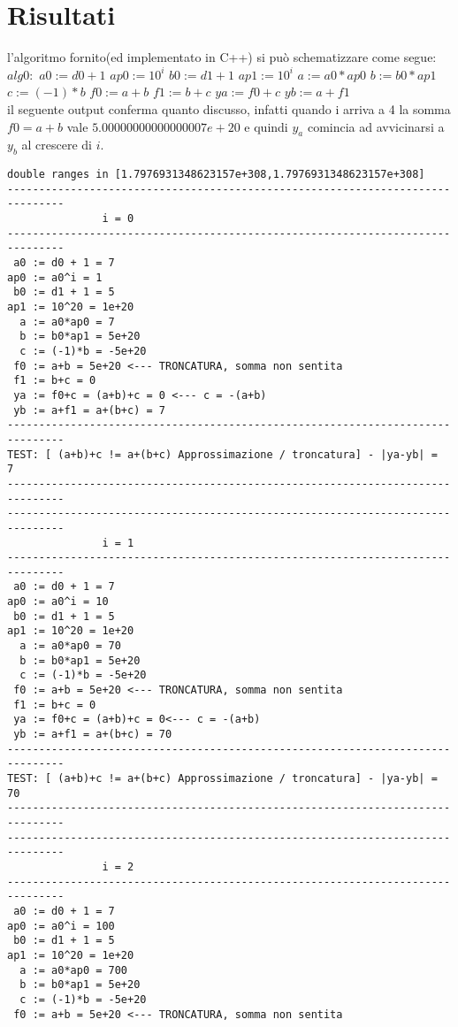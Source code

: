 \documentclass[10pt,a4paper]{article}
\begin{document}
\section{Risultati}
l'algoritmo fornito(ed implementato in C++) si pu\`o schematizzare come segue:\\
$alg0:$ $a0 := d0 + 1$ $ap0 := 10^i$ $b0:= d1 + 1$ $ap1:=10^i$ $a := a0*ap0$ $b := b0*ap1$ $c := (-1)*b$ $f0 := a+b$ $f1 := b+c$ $ya := f0+c$  $yb := a+f1$\\

il seguente output conferma quanto discusso, infatti quando i arriva a 4 la somma $f0=a+b$ vale $5.00000000000000007e+20$ e quindi $y_a$ comincia ad avvicinarsi a $y_b$ al crescere di $i$.\\ 
\begin{lstlisting}
double ranges in [1.7976931348623157e+308,1.7976931348623157e+308]
-------------------------------------------------------------------------------
               i = 0 
-------------------------------------------------------------------------------
 a0 := d0 + 1 = 7
ap0 := a0^i = 1
 b0 := d1 + 1 = 5
ap1 := 10^20 = 1e+20
  a := a0*ap0 = 7
  b := b0*ap1 = 5e+20
  c := (-1)*b = -5e+20 
 f0 := a+b = 5e+20 <--- TRONCATURA, somma non sentita
 f1 := b+c = 0
 ya := f0+c = (a+b)+c = 0 <--- c = -(a+b) 
 yb := a+f1 = a+(b+c) = 7
-------------------------------------------------------------------------------
TEST: [ (a+b)+c != a+(b+c) Approssimazione / troncatura] - |ya-yb| =  7
-------------------------------------------------------------------------------
-------------------------------------------------------------------------------
               i = 1
-------------------------------------------------------------------------------
 a0 := d0 + 1 = 7
ap0 := a0^i = 10
 b0 := d1 + 1 = 5
ap1 := 10^20 = 1e+20
  a := a0*ap0 = 70
  b := b0*ap1 = 5e+20
  c := (-1)*b = -5e+20
 f0 := a+b = 5e+20 <--- TRONCATURA, somma non sentita
 f1 := b+c = 0
 ya := f0+c = (a+b)+c = 0<--- c = -(a+b)
 yb := a+f1 = a+(b+c) = 70
-------------------------------------------------------------------------------
TEST: [ (a+b)+c != a+(b+c) Approssimazione / troncatura] - |ya-yb| =  70
-------------------------------------------------------------------------------
-------------------------------------------------------------------------------
               i = 2
-------------------------------------------------------------------------------
 a0 := d0 + 1 = 7
ap0 := a0^i = 100
 b0 := d1 + 1 = 5
ap1 := 10^20 = 1e+20
  a := a0*ap0 = 700
  b := b0*ap1 = 5e+20
  c := (-1)*b = -5e+20
 f0 := a+b = 5e+20 <--- TRONCATURA, somma non sentita

\end{lstlisting}
\end{document}
